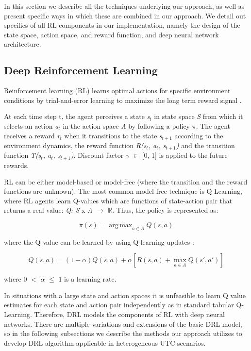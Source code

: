 \documentclass{llncs}
\DeclareMathOperator*{\argmax}{arg\,max}
\begin{document}
In this section we describe all the techniques underlying our approach, as well as present specific ways in which these are combined in our approach. We detail out specifics of all RL components in our implementation, namely the design of the state space, action space, and reward function, and deep neural network architecture. 

\subsection{Deep Reinforcement Learning}

Reinforcement learning (RL) learns optimal actions for specific environment conditions by trial-and-error learning to maximize the long term reward signal \cite{RichardS.SuttonandAndrewG.Barto2018}.

At each time step t, the agent perceives a state \textit{s$_{t}$} in state space \textit{S} from which it selects an action \textit{a$_{t}$} in the action space \textit{A} by following a policy \textit{$\pi$}. The agent receives a reward \textit{r$_{t}$} when it transitions to the state \textit{s$_{t+1}$} according to the environment dynamics, the reward function  \textit{R(s$_{t}$, a$_{t}$, s$_{t+1}$)} and the transition function \textit{T(s$_{t}$, a$_{t}$, s$_{t+1}$)}. Discount factor $\gamma$ $\in$ [0, 1] is applied to the future rewards.

RL can be either model-based or model-free (where the transition and the reward functions are unknown). The most common model-free technique is Q-Learning, where RL agents learn Q-values which are functions of state-action pair that returns a real value: \textit{Q: S} x \textit{A $\rightarrow$ $\mathbb{R}$}. Thus, the policy is represented as:

\begin{equation}
\pi(s) = \argmax_{a \in A} Q(s, a)
\end{equation}

where the Q-value can be learned by using Q-learning updates \cite{Watkins1992}:

\begin{equation}
Q(s, a) = (1 - \alpha)Q(s, a) + \alpha[R(s, a) + \max_{a \in A}Q(s', a')]
\end{equation}

where 0 $<$ $\alpha$ $\leq$ 1 is a learning rate.

In situations with a large state and action spaces it is unfeasible to learn Q value estimates for each state and action pair independently as in standard tabular Q-Learning. Therefore, DRL models the components of RL with deep neural networks. There are multiple variations and extensions of the basic DRL model, so in the following subsections we describe the methods our approach utilizes to develop DRL algorithm applicable in heterogeneous UTC scenarios. 
\end{document}
